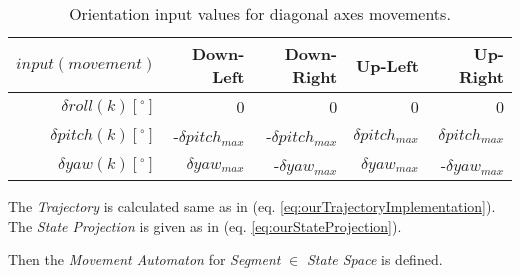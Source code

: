 \begin{table}[H]
    \centering
    \begin{tabular}{r||r|r|r|r}
        $input(movement)$             & Down-Left & Down-Right & Up-Left  & Up-Right   \\\hline\hline

        $\delta  roll(k) [^\circ]$	& 0	    & 0	    & 0    & 0     \\\hline
        $\delta pitch(k) [^\circ]$     & -$\delta pitch_{max}$ & -$\delta pitch_{max}$ & $\delta pitch_{max}$ & $\delta pitch_{max}$     \\\hline
        $\delta   yaw(k) [^\circ]$    & $\delta yaw_{max}$	& -$\delta yaw_{max}$	& $\delta yaw_{max}$ & -$\delta yaw_{max}$ \\
    \end{tabular}
    \caption{Orientation input values for diagonal axes movements.}
    \label{tab:movements4}
\end{table}

\begin{note}
    The \emph{Trajectory} is calculated same as in (eq. \ref{eq:ourTrajectoryImplementation}). The \emph{State Projection} is given as in (eq. \ref{eq:ourStateProjection}).
\end{note}

Then the \emph{Movement Automaton} for \emph{Segment} $\in$ \emph{State Space} is defined.

